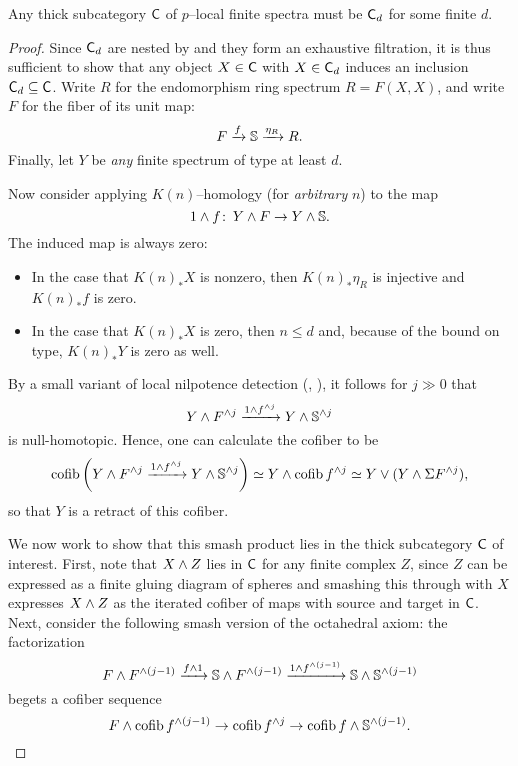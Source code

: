 \begin{theorem}
Any thick subcategory $\CatOf C$ of $p$--local finite spectra must be $\CatOf C_d$ for some finite $d$.
\end{theorem}
\begin{proof}
Since $\CatOf C_d$ are nested by  and they form an exhaustive filtration, it is thus sufficient to show that any object $X \in \CatOf C$ with $X \in \CatOf C_d$ induces an inclusion $\CatOf C_d \subseteq \CatOf C$.  Write $R$ for the endomorphism ring spectrum $R = F(X, X)$, and write $F$ for the fiber of its unit map: \[F \xrightarrow{f} \S \xrightarrow{\eta_R} R.\]  Finally, let $Y$ be \emph{any} finite spectrum of type at least $d$.

Now consider applying $K(n)$--homology (for \emph{arbitrary} $n$) to the map \[1 \sm f\co Y \sm F \to Y \sm \S.\]  The induced map is always zero:
\begin{itemize}
\item In the case that $K(n)_* X$ is nonzero, then $K(n)_* \eta_R$ is injective and $K(n)_* f$ is zero.
\item In the case that $K(n)_* X$ is zero, then $n \le d$ and, because of the bound on type, $K(n)_* Y$ is zero as well.
\end{itemize}
By a small variant of local nilpotence detection (, \cite[Corollary 2.5]{HopkinsSmith}), it follows for $j \gg 0$ that \[Y \sm F^{\sm j} \xrightarrow{1 \sm f^{\sm j}} Y \sm \S^{\sm j}\] is null-homotopic.  Hence, one can calculate the cofiber to be \[\operatorname{cofib}\left( Y \sm F^{\sm j} \xrightarrow{1 \sm f^{\sm j}} Y \sm \S^{\sm j} \right) \simeq Y \sm \operatorname{cofib} f^{\sm j} \simeq Y \vee (Y \sm \Susp F^{\sm j}),\] so that $Y$ is a retract of this cofiber.

We now work to show that this smash product lies in the thick subcategory $\CatOf C$ of interest.  First, note that $X \sm Z$ lies in $\CatOf C$ for any finite complex $Z$, since $Z$ can be expressed as a finite gluing diagram of spheres and smashing this through with $X$ expresses $X \sm Z$ as the iterated cofiber of maps with source and target in $\CatOf C$.  Next, consider the following smash version of the octahedral axiom: the factorization \[F \sm F^{\sm (j-1)} \xrightarrow{f \sm 1} \S \sm F^{\sm (j-1)} \xrightarrow{1 \sm f^{\sm (j-1)}} \S \sm \S^{\sm (j-1)}\] begets a cofiber sequence \[F \sm \operatorname{cofib} f^{\sm (j-1)} \to \operatorname{cofib} f^{\sm j} \to \operatorname{cofib} f \sm \S^{\sm (j-1)}.\]


\end{proof}

